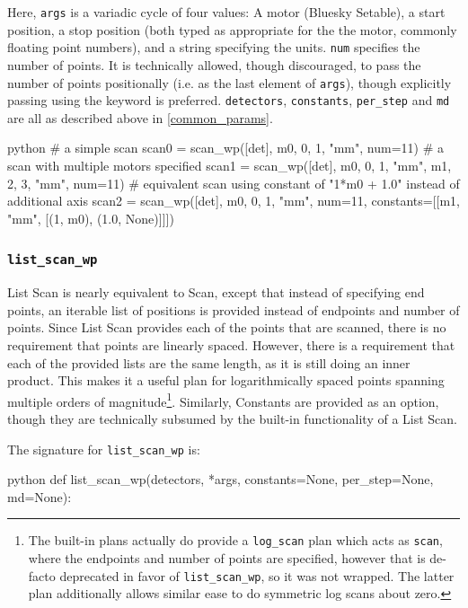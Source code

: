Here, \texttt{args} is a variadic cycle of four values: A motor (Bluesky Setable), a start position, a stop position (both typed as appropriate for the the motor, commonly floating point numbers), and a string specifying the units.
\texttt{num} specifies the number of points.
It is technically allowed, though discouraged, to pass the number of points positionally (i.e. as the last element of \texttt{args}), though explicitly passing using the keyword is preferred.
\texttt{detectors}, \texttt{constants}, \texttt{per\_step} and \texttt{md} are all as described above in \ref{common_params}.

\begin{codefragment}{python}
# a simple scan
scan0 = scan_wp([det], m0, 0, 1, "mm", num=11)
# a scan with multiple motors specified
scan1 = scan_wp([det], m0, 0, 1, "mm", m1, 2, 3, "mm", num=11)
# equivalent scan using constant of "1*m0 + 1.0" instead of additional axis
scan2 = scan_wp([det], m0, 0, 1, "mm", num=11,
                constants=[[m1, "mm", [(1, m0), (1.0, None)]]])
\end{codefragment}

\subsubsection{\texttt{list\_scan\_wp}}

List Scan is nearly equivalent to Scan, except that instead of specifying end points, an iterable list of positions is provided instead of endpoints and number of points.
Since List Scan provides each of the points that are scanned, there is no requirement that points are linearly spaced.
However, there is a requirement that each of the provided lists are the same length, as it is still doing an inner product.
This makes it a useful plan for logarithmically spaced points spanning multiple orders of magnitude\footnote{The built-in plans actually do provide a \texttt{log\_scan} plan which acts as \texttt{scan}, where the endpoints and number of points are specified, however that is de-facto deprecated in favor of \texttt{list\_scan\_wp}, so it was not wrapped. The latter plan additionally allows similar ease to do symmetric log scans about zero.}.
Similarly, Constants are provided as an option, though they are technically subsumed by the built-in functionality of a List Scan.

The signature for \texttt{list\_scan\_wp} is:

\begin{codefragment}{python}
def list_scan_wp(detectors, *args, constants=None, per_step=None, md=None):
\end{codefragment}

